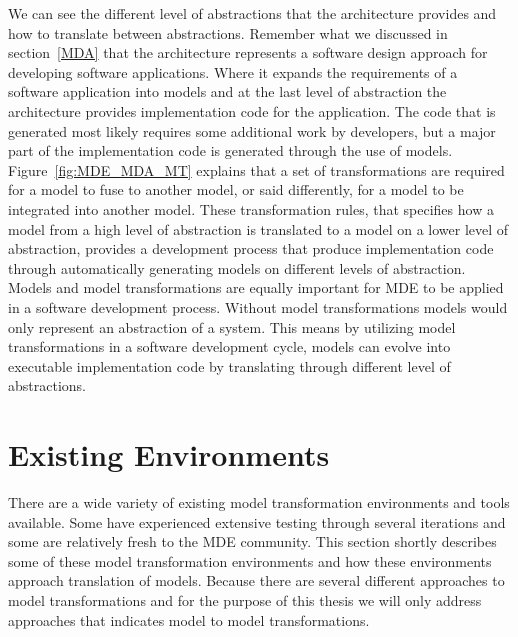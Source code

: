 We can see the different level of abstractions that the architecture provides
and how to translate between abstractions. Remember what we discussed in
section~\ref{MDA} that the architecture represents a software design approach
for developing software applications. Where it expands the requirements of
a software application into models and at the last level of abstraction the
architecture provides implementation code for the application. The code that is
generated most likely requires some additional work by developers, but a major
part of the implementation code is generated through the use of models.
Figure~\ref{fig:MDE_MDA_MT} explains that a set of transformations are required
for a model to fuse to another model, or said differently, for a model to be
integrated into another model. These transformation rules, that specifies how a model from
a high level of abstraction is translated to a model on a lower level of
abstraction, provides a development process that produce implementation code
through automatically generating models on different levels of abstraction.
Models and model transformations are equally important for MDE to be applied in
a software development process. Without model transformations models would only
represent an abstraction of a system. This means by utilizing model
transformations in a software development cycle, models can evolve into
executable implementation code by translating through different level of
abstractions. 

\section{Existing Environments}
\label{tooling}

There are a wide variety of existing model transformation environments and
tools available. Some have experienced extensive testing through several
iterations and some are relatively fresh to the MDE community. This section
shortly describes some of these model transformation environments and how these
environments approach translation of models. Because there are several different
approaches to model transformations and for the purpose of this thesis we will
only address approaches that indicates model to model transformations. 

